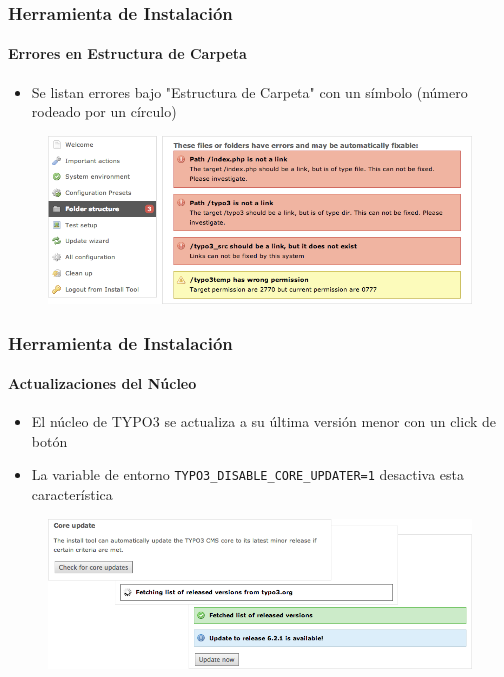 
\begin{frame}[fragile]
	\frametitle{Herramienta de Instalación}
	\framesubtitle{Errores en Estructura de Carpeta}

	\begin{itemize}
		\item Se listan errores bajo "Estructura de Carpeta" con un símbolo (número rodeado por un círculo)
	\end{itemize}

	\begin{figure}
		\includegraphics[width=0.95\linewidth]{Images/InstallTool/ErrorsInFolderStructure.png}
	\end{figure}

\end{frame}


\begin{frame}[fragile]
	\frametitle{Herramienta de Instalación}
	\framesubtitle{Actualizaciones del Núcleo}

	\begin{itemize}
		\item El núcleo de TYPO3 se actualiza a su última versión menor con un click de botón
		\item La variable de entorno \texttt{TYPO3\_DISABLE\_CORE\_UPDATER=1} desactiva esta característica
	\end{itemize}

	\begin{figure}
		\includegraphics[width=0.95\linewidth]{Images/InstallTool/CoreUpdate.png}
	\end{figure}

\end{frame}

